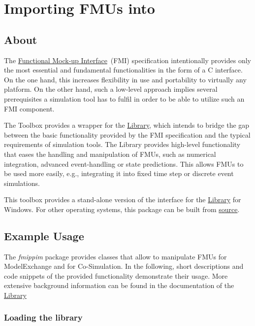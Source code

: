 \chapter{Importing FMUs into \matlab}


\section{About}

The \href{https://fmi-standard.org/}{Functional Mock-up Interface}~(FMI) specification intentionally provides only the most essential and fundamental functionalities in the form of a C interface.
On the one hand, this increases flexibility in use and portability to virtually any platform.
On the other hand, such a low-level approach implies several prerequisites a simulation tool has to fulfil in order to be able to utilize such an FMI component.

The \fmipp \matlab Toolbox provides a wrapper for the \href{http://fmipp.sourceforge.net}{\fmipp Library}, which intends to bridge the gap between the basic functionality provided by the FMI specification and the typical requirements of simulation tools.
The \fmipp Library provides high-level functionality that eases the handling and manipulation of FMUs, such as numerical integration, advanced event-handling or state predictions.
This allows FMUs to be used more easily, e.g., integrating it into fixed time step or discrete event simulations.

This toolbox provides a stand-alone version of the \matlab interface for the \href{http://fmipp.sourceforge.net}{\fmipp Library} for Windows.
For other operating systems, this package can be built from \href{http://sourceforge.net/p/fmipp/code/ci/master/tree/}{source}.


\section{Example Usage}

The \emph{fmippim} package provides classes that allow to manipulate FMUs for ModelExchange and for Co-Simulation.
In the following, short descriptions and code snippets of the provided functionality demonstrate their usage.
More extensive background information can be found in the documentation of the \href{http://fmipp.sourceforge.net}{\fmipp Library}


\subsection{Loading the library}

